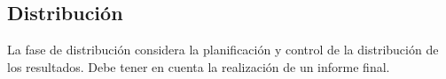 \subsection{Distribución}
La fase de distribución considera la planificación y control de la distribución de los resultados. Debe tener en cuenta la realización de un informe final.

